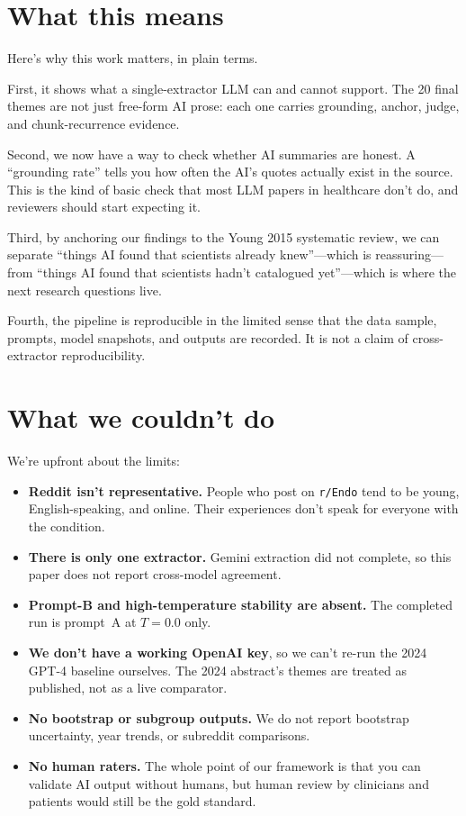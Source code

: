 \documentclass[11pt]{article}
\begin{document}
\section{What this means}

Here's why this work matters, in plain terms.

First, it shows what a single-extractor LLM can and cannot support.
The 20 final themes are not just free-form AI prose: each one carries
grounding, anchor, judge, and chunk-recurrence evidence.

Second, we now have a way to check whether AI summaries are honest. A
``grounding rate'' tells you how often the AI's quotes actually exist
in the source. This is the kind of basic check that most LLM papers
in healthcare don't do, and reviewers should start expecting it.

Third, by anchoring our findings to the Young 2015 systematic review,
we can separate ``things AI found that scientists already
knew''---which is reassuring---from ``things AI found that scientists
hadn't catalogued yet''---which is where the next research questions
live.

Fourth, the pipeline is reproducible in the limited sense that the data
sample, prompts, model snapshots, and outputs are recorded. It is not a
claim of cross-extractor reproducibility.

\section{What we couldn't do}

We're upfront about the limits:

\begin{itemize}
  \item \textbf{Reddit isn't representative.} People who post on
    \texttt{r/Endo} tend to be young, English-speaking, and online.
    Their experiences don't speak for everyone with the condition.
  \item \textbf{There is only one extractor.} Gemini extraction did not
    complete, so this paper does not report cross-model agreement.
  \item \textbf{Prompt-B and high-temperature stability are absent.}
    The completed run is prompt~A at $T=0.0$ only.
  \item \textbf{We don't have a working OpenAI key}, so we can't
    re-run the 2024 GPT-4 baseline ourselves. The 2024 abstract's
    themes are treated as published, not as a live comparator.
  \item \textbf{No bootstrap or subgroup outputs.} We do not report
    bootstrap uncertainty, year trends, or subreddit comparisons.
  \item \textbf{No human raters.} The whole point of our framework is
    that you can validate AI output without humans, but human review
    by clinicians and patients would still be the gold standard.
\end{itemize}
\end{document}
